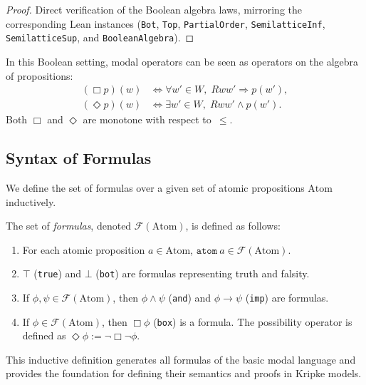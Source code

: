\begin{proof}
    \label{proof:boolean-structure}
  \leanok
  Direct verification of the Boolean algebra laws, mirroring the
  corresponding Lean instances (\texttt{Bot}, \texttt{Top},
  \texttt{PartialOrder}, \texttt{SemilatticeInf},
  \texttt{SemilatticeSup}, and \texttt{BooleanAlgebra}).
\end{proof}

In this Boolean setting, modal operators can be seen as operators on
the algebra of propositions:
  \begin{align*}
    (\Box p)(w) &\iff \forall w' \in W,\; Rww' \Rightarrow p(w'), \\
    (\Diamond p)(w) &\iff \exists w' \in W,\; Rww' \wedge p(w').
  \end{align*}
  Both $\Box$ and $\Diamond$ are monotone with respect to~$\leq$.


\subsection{Syntax of Formulas}

We define the set of formulas over a given set of atomic propositions $\mathrm{Atom}$ inductively.  

\begin{definition}
    \label{def:form}
  \leanok
The set of \emph{formulas}, denoted $\mathcal{F}(\mathrm{Atom})$, is defined as follows:
\begin{enumerate}
  \item For each atomic proposition $a \in \mathrm{Atom}$, $\mathtt{atom}\ a \in \mathcal{F}(\mathrm{Atom})$.
  \item $\top$ (\texttt{true}) and $\bot$ (\texttt{bot}) are formulas representing truth and falsity.
  \item If $\phi, \psi \in \mathcal{F}(\mathrm{Atom})$, then $\phi \wedge \psi$ (\texttt{and}) and $\phi \to \psi$ (\texttt{imp}) are formulas.
  \item If $\phi \in \mathcal{F}(\mathrm{Atom})$, then $\Box \phi$ (\texttt{box}) is a formula. The possibility operator is defined as $\Diamond \phi := \neg \Box \neg \phi$.
\end{enumerate}
\end{definition}
This inductive definition generates all formulas of the basic modal language and provides the foundation for defining their semantics and proofs in Kripke models.




